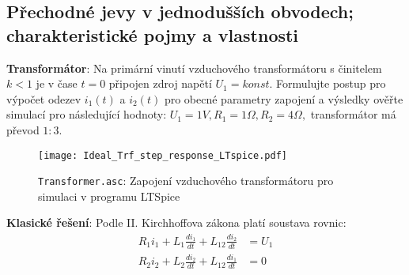      \subsection{Přechodné jevy v jednodušších obvodech; charakteristické pojmy a vlastnosti}
       \begin{example} \textbf{Transformátor}: Na primární vinutí vzduchového transformátoru s
         činitelem $k < 1$ je v čase $t=0$ připojen zdroj napětí $U_1 = konst$. Formulujte postup
         pro výpočet odezev $i_1(t)$ a $i_2(t)$ pro obecné parametry zapojení a výsledky ověřte
         simulací pro následující hodnoty: $U_1 = 1V, R_1 = 1\Omega, R_2 = 4\Omega, $ transformátor
         má převod $1:3$.
         \begin{figure}[ht!]
           \centering
           \texttt{[image: Ideal\_Trf\_step\_response\_LTspice.pdf]}
           \caption[Výpočet odezvy ]{\texttt{Transformer.asc}: Zapojení vzduchového transformátoru
                   pro simulaci v programu LTSpice}
           \label{TEO:fig_trafo_int_uprim}
         \end{figure}

       \textbf{Klasické řešení}: Podle II. Kirchhoffova zákona platí soustava rovnic:
         \begin{align}\label{TEO:eq_trafo_IIKz}
           R_1i_1 + L_1\frac{di_1}{dt} + L_{12}\frac{di_2}{dt} &= U_1 \\
           R_2i_2 + L_2\frac{di_2}{dt} + L_{12}\frac{di_1}{dt} &= 0
         \end{align}


\end{example}

